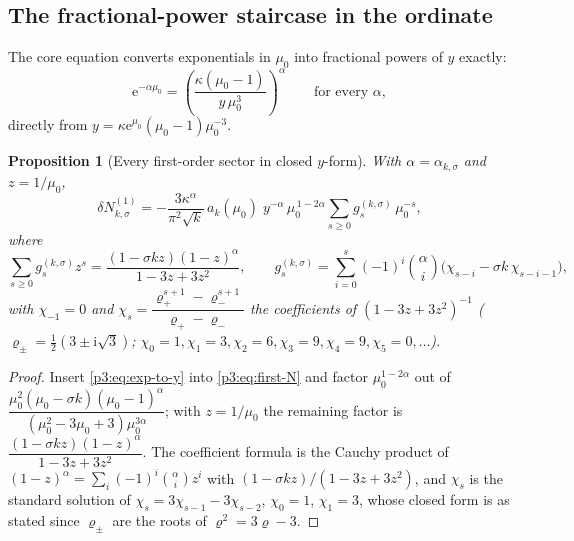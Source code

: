 \documentclass[11pt,a4paper,oneside]{book}
\theoremstyle{plain}
\newtheorem{proposition}[theorem]{Proposition}
\theoremstyle{definition}
\theoremstyle{remark}
\newcommand{\e}{\mathrm{e}}
\newcommand{\ii}{\mathrm{i}}
\begin{document}
\subsection{The fractional-power staircase in the ordinate}

The core equation converts exponentials in $\mu_{0}$ into fractional powers of $y$ exactly:
\begin{equation}\label{p3:eq:exp-to-y}
 \e^{-\alpha\mu_{0}}=\left(\frac{\kappa(\mu_{0}-1)}{y\,\mu_{0}^{3}}\right)^{\!\alpha}
 \qquad\text{for every }\alpha,
\end{equation}
directly from $y=\kappa\e^{\mu_{0}}(\mu_{0}-1)\mu_{0}^{-3}$.

\begin{proposition}[Every first-order sector in closed $y$-form]
\label{p3:prop:y-form}
With $\alpha=\alpha_{k,\sigma}$ and $z=1/\mu_{0}$,
\begin{equation}\label{p3:eq:y-form}
 \delta N^{(1)}_{k,\sigma}
 =-\frac{3\kappa^{\alpha}}{\pi^{2}\sqrt k}\,a_{k}(\mu_{0})\;
 y^{-\alpha}\,\mu_{0}^{\,1-2\alpha}\sum_{s\ge0}g^{(k,\sigma)}_{s}\,\mu_{0}^{-s},
\end{equation}
where
\begin{equation}\label{p3:eq:g-gf}
 \sum_{s\ge0}g^{(k,\sigma)}_{s}z^{s}
 =\frac{(1-\sigma kz)(1-z)^{\alpha}}{1-3z+3z^{2}},
 \qquad
 g^{(k,\sigma)}_{s}=\sum_{i=0}^{s}(-1)^{i}\binom{\alpha}{i}
 \bigl(\chi_{s-i}-\sigma k\,\chi_{s-i-1}\bigr),
\end{equation}
with $\chi_{-1}=0$ and $\chi_{s}=\dfrac{\varrho_{+}^{s+1}-\varrho_{-}^{s+1}}
{\varrho_{+}-\varrho_{-}}$ the coefficients of $(1-3z+3z^{2})^{-1}$
($\varrho_{\pm}=\tfrac12(3\pm\ii\sqrt3)$; $\chi_{0}=1,\chi_{1}=3,\chi_{2}=6,
\chi_{3}=9,\chi_{4}=9,\chi_{5}=0,\dots$).
\end{proposition}

\begin{proof}
Insert \cref{p3:eq:exp-to-y} into \cref{p3:eq:first-N} and factor $\mu_{0}^{1-2\alpha}$ out of
$\dfrac{\mu_{0}^{2}(\mu_{0}-\sigma k)(\mu_{0}-1)^{\alpha}}
{(\mu_{0}^{2}-3\mu_{0}+3)\mu_{0}^{3\alpha}}$; with $z=1/\mu_{0}$ the remaining factor is
$\dfrac{(1-\sigma kz)(1-z)^{\alpha}}{1-3z+3z^{2}}$. The coefficient formula is the Cauchy product
of $(1-z)^{\alpha}=\sum_{i}(-1)^{i} \binom\alpha i z^{i}$ with $(1-\sigma kz)/(1-3z+3z^{2})$, and
$\chi_{s}$ is the standard solution of $\chi_{s}=3\chi_{s-1}-3\chi_{s-2}$, $\chi_{0}=1$,
$\chi_{1}=3$, whose closed form is as stated since $\varrho_{\pm}$ are the roots of
$\varrho^{2}=3\varrho-3$.
\end{proof}
\end{document}
